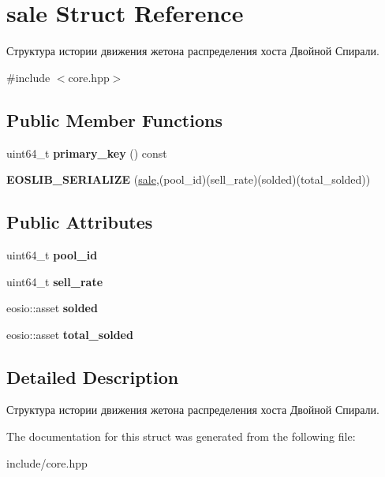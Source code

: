 \hypertarget{structsale}{}\section{sale Struct Reference}
\label{structsale}


Структура истории движения жетона распределения хоста Двойной Спирали.  




{\ttfamily \#include $<$core.\+hpp$>$}

\subsection*{Public Member Functions}
\begin{DoxyCompactItemize}
\item 
\mbox{\label{structsale_ab961633ac6594ad31b8862f2847702f5}} 
uint64\+\_\+t {\bfseries primary\+\_\+key} () const
\item 
\mbox{\label{structsale_a5d93f15e70be03416e1a2ffa19c58748}} 
{\bfseries E\+O\+S\+L\+I\+B\+\_\+\+S\+E\+R\+I\+A\+L\+I\+ZE} (\mbox{\hyperlink{structsale}{sale}},(pool\+\_\+id)(sell\+\_\+rate)(solded)(total\+\_\+solded))
\end{DoxyCompactItemize}
\subsection*{Public Attributes}
\begin{DoxyCompactItemize}
\item 
\mbox{\label{structsale_a9a9e29e910e7fad4176920b4c5820598}} 
uint64\+\_\+t {\bfseries pool\+\_\+id}
\item 
\mbox{\label{structsale_adcf1a6b39d7e7a342974ae39d90a4126}} 
uint64\+\_\+t {\bfseries sell\+\_\+rate}
\item 
\mbox{\label{structsale_a75f7c022bad8909393daa51e86c970fc}} 
eosio\+::asset {\bfseries solded}
\item 
\mbox{\label{structsale_af1093f1b1348b3a9a91362f3228ee503}} 
eosio\+::asset {\bfseries total\+\_\+solded}
\end{DoxyCompactItemize}


\subsection{Detailed Description}
Структура истории движения жетона распределения хоста Двойной Спирали. 

The documentation for this struct was generated from the following file\+:\begin{DoxyCompactItemize}
\item 
include/core.\+hpp\end{DoxyCompactItemize}
